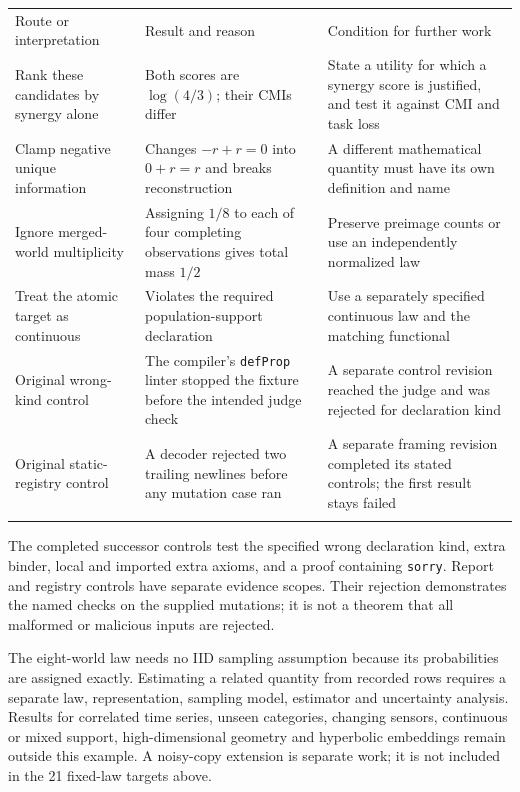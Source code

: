 {\def\LTcaptype{none} %
\begin{longtable}[]{@{}
  >{\raggedright\arraybackslash}p{}
  >{\raggedright\arraybackslash}p{}
  >{\raggedright\arraybackslash}p{}@{}}
\toprule\noalign{}
\begin{minipage}[b]{\linewidth}\raggedright
Route or interpretation
\end{minipage} & \begin{minipage}[b]{\linewidth}\raggedright
Result and reason
\end{minipage} & \begin{minipage}[b]{\linewidth}\raggedright
Condition for further work
\end{minipage} \\*
\midrule\noalign{}
\endhead
\bottomrule\noalign{}
\endfoot
Rank these candidates by synergy alone & Both scores are \(\log(4/3)\); their CMIs differ & State a utility for which a synergy score is justified, and test it against CMI and task loss \\*
Clamp negative unique information & Changes \(-r+r=0\) into \(0+r=r\) and breaks reconstruction & A different mathematical quantity must have its own definition and name \\*
Ignore merged-world multiplicity & Assigning \(1/8\) to each of four completing observations gives total mass \(1/2\) & Preserve preimage counts or use an independently normalized law \\*
Treat the atomic target as continuous & Violates the required population-support declaration & Use a separately specified continuous law and the matching functional \\*
Original wrong-kind control & The compiler's \texttt{defProp} linter stopped the fixture before the intended judge check & A separate control revision reached the judge and was rejected for declaration kind \\*
Original static-registry control & A decoder rejected two trailing newlines before any mutation case ran & A separate framing revision completed its stated controls; the first result stays failed \\*
\end{longtable}
}

The completed successor controls test the specified wrong declaration kind, extra binder, local and imported extra axioms, and a proof containing \texttt{sorry}. Report and registry controls have separate evidence scopes. Their rejection demonstrates the named checks on the supplied mutations; it is not a theorem that all malformed or malicious inputs are rejected.

The eight-world law needs no IID sampling assumption because its probabilities are assigned exactly. Estimating a related quantity from recorded rows requires a separate law, representation, sampling model, estimator and uncertainty analysis. Results for correlated time series, unseen categories, changing sensors, continuous or mixed support, high-dimensional geometry and hyperbolic embeddings remain outside this example. A noisy-copy extension is separate work; it is not included in the 21 fixed-law targets above.
